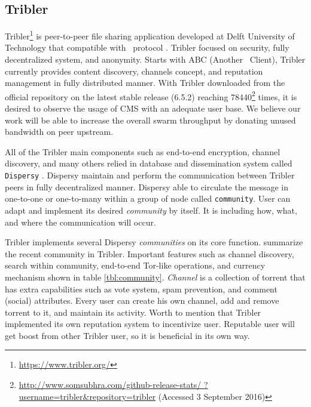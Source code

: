 


\subsection{Tribler}
Tribler\footnote{\url{https://www.tribler.org/}} is peer-to-peer file sharing application developed at Delft University of Technology that compatible with \bt~protocol \cite{2008:tribler:pouwelse}. Tribler focused on security, fully decentralized system, and anonymity. Starts with ABC (Another \bt~Client), Tribler currently provides content discovery, channels concept, and reputation management in fully distributed manner. With Tribler downloaded from the official repository on the latest stable release (6.5.2) reaching  78440\footnote{\url{http://www.somsubhra.com/github-release-stats/ ?username=tribler&repository=tribler} (Accessed 3 September 2016)} times, it is desired to observe the usage of CMS with an adequate user base. We believe our work will be able to increase the overall swarm throughput by donating unused bandwidth on peer upstream.

All of the Tribler main components such as end-to-end encryption, channel discovery, and many others relied in database and dissemination system called \texttt{Dispersy} \cite{2013:dispersy:zeilemaker}. Dispersy maintain and perform the communication between Tribler peers in fully decentralized manner. Dispersy able to circulate the message in one-to-one or one-to-many within a group of node called \texttt{community}. User can adapt and implement its desired \textit{community} by itself. It is including how, what, and where the communication will occur.

Tribler implements several Dispersy \textit{communities} on its core function. \citeauthor{2016:tribler-techdebt:vos} summarize the recent community in Tribler. Important features such as channel discovery, search within community, end-to-end Tor-like operations, and currency mechanism shown in table \ref{tbl:community}. \textit{Channel} is a collection of torrent that has extra capabilities such as vote system, spam prevention, and comment (social) attributes. Every user can create his own channel, add and remove torrent to it, and maintain its activity. Worth to mention that Tribler implemented its own reputation system to incentivize user. Reputable user will get boost from other Tribler user, so it is beneficial in its own way.

